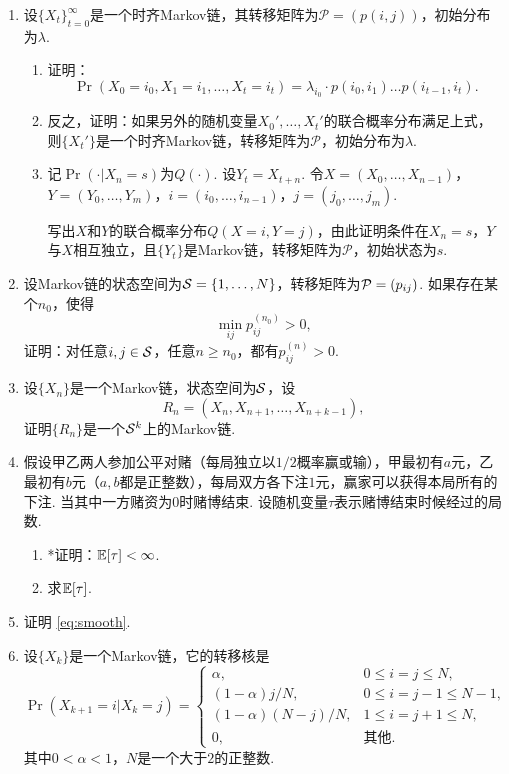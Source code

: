 \begin{enumerate}[fullwidth]

    \item \label{exercise:Markov-property} 设$\{X_t\}_{t=0}^{\infty}$是一个时齐Markov链，其转移矩阵为$\mathcal P=(p(i,j))$，初始分布为$\lambda$.
    \begin{enumerate}
        \item 证明：
        \[\Pr(X_0=i_0,X_1=i_1,\dots,X_t=i_t)=\lambda_{i_0}\cdot p(i_0,i_1)\dots p(i_{t-1},i_t).\]
        \item 反之，证明：如果另外的随机变量$X_0',\dots,X_t'$的联合概率分布满足上式，则$\{X_t'\}$是一个时齐Markov链，转移矩阵为$\mathcal P$，初始分布为$\lambda$.
        \item 记$\Pr(\cdot|X_n=s)$为$Q(\cdot)$. 设$Y_t=X_{t+n}$. 令$X=(X_0,\dots, X_{n-1})$，$Y=(Y_0,\dots,Y_m)$，$i=(i_0,\dots,i_{n-1})$，$j=(j_0,\dots,j_{m})$. 
        
        写出$X$和$Y$的联合概率分布$Q(X=i,Y=j)$，由此证明条件在$X_{n}=s$，$Y$与$X$相互独立，且$\{Y_t\}$是Markov链，转移矩阵为$\mathcal P$，初始状态为$s$.
    \end{enumerate}

    \item \label{exercise:ergodic} 设Markov链的状态空间为$\mathcal S=\{1,\dots,N\}$，转移矩阵为$\mathcal P=(p_{ij})$. 如果存在某个$n_0$，使得
    \[
        \min_{ij}p_{ij}^{(n_0)}>0,
    \]
    证明：对任意$i,j\in\mathcal S$，任意$n\geq n_0$，都有$p_{ij}^{(n)}>0$.

    \item \label{exercise:MDP-k-step} 设$\{X_n\}$是一个Markov链，状态空间为$\mathcal S$，设
    \[R_{n}=(X_n,X_{n+1},\dots,X_{n+k-1}),\]
    证明$\{R_n\}$是一个$\mathcal S^k$上的Markov链.

    \item 假设甲乙两人参加公平对赌（每局独立以$1/2$概率赢或输），甲最初有$a$元，乙最初有$b$元（$a,b$都是正整数），每局双方各下注$1$元，赢家可以获得本局所有的下注. 当其中一方赌资为$0$时赌博结束. 设随机变量$\tau$表示赌博结束时候经过的局数.
    \begin{enumerate}
        \item *证明：$\mathbb{E}[\tau]<\infty$.
        \item 求$\mathbb{E}[\tau]$.
    \end{enumerate}

    \item \label{exercise:smooth-HMM} 证明 \eqref{eq:smooth}.
    
    \item \label{exercise:ball-A-num} 设$\{X_k\}$是一个Markov链，它的转移核是
    \[
        \Pr(X_{k+1}=i|X_k=j) = \begin{cases}
            \alpha, & 0\leq i = j\leq N,\\
            (1-\alpha)j/N, & 0\leq i = j-1\leq N-1,\\
            (1-\alpha)(N-j)/N, & 1\leq i = j+1\leq N,\\
            0, & \text{其他}.
        \end{cases}
    \]
    其中$0<\alpha<1$，$N$是一个大于$2$的正整数.


\end{enumerate}
